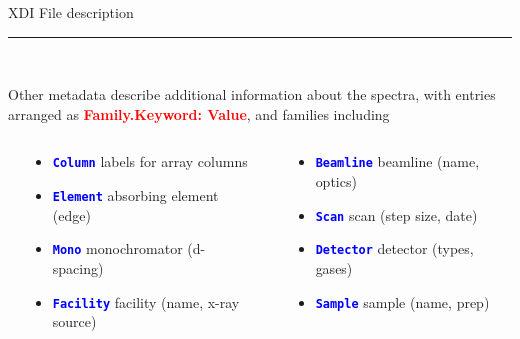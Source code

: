 \documentclass[final]{beamer}
\newcommand{\Color}[2]{{\textcolor{#1}{#2}}}
\newcommand{\BoldRed}[1]{{\Color{Red}{\bf{#1}}}}
\newcommand{\Blue}[1]{{\Color{Blue}{\bf{#1}}}}
\begin{document}
\begin{frame}{}
\begin{columns}[t]
\begin{column}{.42\linewidth}
\begin{block}{\large XDI File description}
         \vspace{3mm}

         \hrule

         \vspace{3mm} {\ }

         \justifying
         Other metadata describe additional information about the spectra, with
         entries arranged as {\BoldRed{{Family.Keyword: Value}}}, and  families including

         \begin{columns}[T]
           \begin{column}{0.03\linewidth}
           \end{column}
           \begin{column}{0.46\linewidth}
             \begin{itemize}
             \item {\Blue{\tt{Column}}}   labels for array columns
             \item {\Blue{\tt{Element}}}  absorbing element (edge)
             \item {\Blue{\tt{Mono}}}     monochromator (d-spacing)
             \item {\Blue{\tt{Facility}}} facility  (name, x-ray source)
           \end{itemize}
           \end{column}
           \begin{column}{0.02\linewidth}
           \end{column}
           \begin{column}{0.46\linewidth}
             \begin{itemize}
             \item {\Blue{\tt{Beamline}}} beamline  (name, optics)
             \item {\Blue{\tt{Scan}}}     scan  (step size, date)
             \item {\Blue{\tt{Detector}}} detector (types, gases)
             \item {\Blue{\tt{Sample}}}   sample (name, prep)
           \end{itemize}

           \end{column}
           \begin{column}{0.03\linewidth}
           \end{column}

         \end{columns}


\end{block}
\end{column}
\end{columns}
\end{frame}
\end{document}
